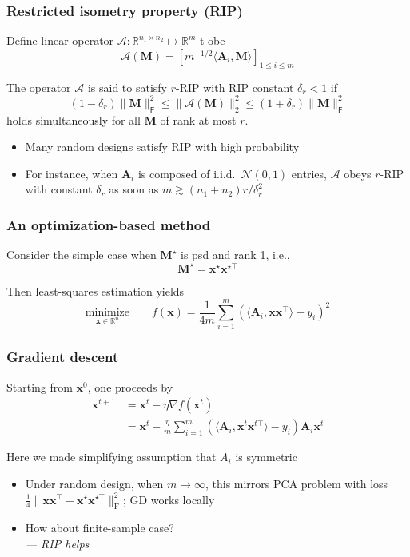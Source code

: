 \documentclass[compress,
mathserif,wide,%
]{beamer}
\begin{document}
\begin{frame}
	\frametitle{Restricted isometry property (RIP)}

Define linear operator $\mathcal{A}: \mathbb{R}^{n_1 \times n_2 } \mapsto \mathbb{R}^{m}$ t obe
\[
\mathcal{A} (\bm{M}) = [ m^{-1/2} \langle \bm{A}_i, \bm{M} \rangle ]_{1 \leq i \leq m}
\]

\vspace{-0.5em}
	\begin{definition}
		The operator $\mathcal{A}$ is said to satisfy $r$-RIP with RIP constant $\delta_{r} < 1$ if 
		\[
		(1 - \delta_{r}) \| \bm{M} \|_{\mathsf{F}}^{2} \leq \|\mathcal{A} (\bm{M}) \|_{2}^{2} \leq (1 + \delta_{r}) \| \bm{M} \|_{\mathsf{F}}^{2}
		\]
		holds simultaneously for all $\bm{M}$ of rank at most $r$.
	\end{definition}

	\begin{itemize}
			\item Many random designs satisfy RIP with high probability
			\item For instance, when $\bm{A}_{i}$ is composed of i.i.d.~$\mathcal{N}(0,1)$ entries, $\mathcal{A}$ obeys $r$-RIP with constant $\delta_{r}$ as soon as $m \gtrsim (n_1 + n_2) r / \delta_{r}^{2}$
	\end{itemize}
\end{frame}

\begin{frame}
	\frametitle{An optimization-based method}
	Consider the simple case when $\bm{M}^\star$ is psd and rank 1, i.e.,
	\[
		\bm{M}^{\star} = \bm{x}^{\star} \bm{x}^{\star \top}
	\]

	\vfill
	Then least-squares estimation yields
	\[
		\underset{\bm{x} \in \mathbb{R}^{n}}{\text{minimize}}\qquad f(\bm{x}) = \frac{1}{4m} \sum_{i=1}^{m} \left( \langle \bm{A}_{i}, \bm{x} \bm{x}^{\top} \rangle - y_i \right)^{2}
	\]

\end{frame}

\begin{frame}
	\frametitle{Gradient descent}
	Starting from $\bm{x}^0$, one proceeds by
	\begin{align*}
		\bm{x}^{t+1} &= \bm{x}^t - \eta \nabla f ( \bm{x}^t ) \\
		&= \bm{x}^t - \frac{\eta}{m} \sum_{i=1}^{m} \left( \langle \bm{A}_{i}, \bm{x}^t \bm{x}^{t\top} \rangle - y_i \right) \bm{A}_{i} \bm{x}^t
	\end{align*}

	Here we made simplifying assumption that $A_{i}$ is symmetric

	\vfill
	\begin{itemize}
			\item Under random design, when $m \to \infty$, this mirrors PCA problem with loss $\frac{1}{4} \| \bm{x} \bm{x}^\top  - \bm{x}^{\star} \bm{x}^{\star \top} \|_{\mathrm{F}}^{2}$; GD works locally
			\item How about finite-sample case? \\
			{\hfill \em \footnotesize --- RIP helps}
	\end{itemize}
\end{frame}
\end{document}
